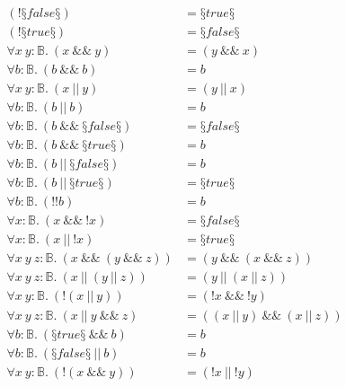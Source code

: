 \begin{conjectureset}[H]
\begin{align}
(!§false§) &= §true§\ \label{overlapenum:not_false2}\\
(!§true§) &= §false§\ \label{overlapenum:not_true2}\\
\forall x\ y : \mathbb{B}.\ (x\ \&\&\ y) &= (y\ \&\&\ x)\ \label{overlapenum:and_comm2}\\
\forall b : \mathbb{B}.\ (b\ \&\&\ b) &= b\ \label{overlapenum:and_self2}\\
\forall x\ y : \mathbb{B}.\ (x\ ||\ y) &= (y\ ||\ x)\ \label{overlapenum:or_comm2}\\
\forall b : \mathbb{B}.\ (b\ ||\ b) &= b\ \label{overlapenum:or_self2}\\
\forall b : \mathbb{B}.\ (b\ \&\&\ §false§) &= §false§\ \label{overlapenum:and_false2}\\
\forall b : \mathbb{B}.\ (b\ \&\&\ §true§) &= b\ \label{overlapenum:and_true2}\\
\forall b : \mathbb{B}.\ (b\ ||\ §false§) &= b\ \label{overlapenum:or_false2}\\
\forall b : \mathbb{B}.\ (b\ ||\ §true§) &= §true§\ \label{overlapenum:or_true2}\\
\forall b : \mathbb{B}.\ (!!b) &= b\ \label{overlapenum:not_not2}\\
\forall x : \mathbb{B}.\ (x\ \&\&\ !x) &= §false§\ \label{overlapenum:and_not_self2}\\
\forall x : \mathbb{B}.\ (x\ ||\ !x) &= §true§\ \label{overlapenum:or_not_self2}\\
\forall x\ y\ z : \mathbb{B}.\ (x\ \&\&\ (y\ \&\&\ z)) &= (y\ \&\&\ (x\ \&\&\ z))\ \label{overlapenum:and_left_comm2}\\
\forall x\ y\ z : \mathbb{B}.\ (x\ ||\ (y\ ||\ z)) &= (y\ ||\ (x\ ||\ z))\ \label{overlapenum:or_left_comm2}\\
\forall x\ y : \mathbb{B}.\ (!(x\ ||\ y)) &= (!x\ \&\&\ !y)\ \label{overlapenum:not_or2}\\
\forall x\ y\ z : \mathbb{B}.\ (x\ ||\ y\ \&\&\ z) &= ((x\ ||\ y)\ \&\&\ (x\ ||\ z))\ \label{overlapenum:or_and_distrib_left2}\\
\forall b : \mathbb{B}.\ (§true§\ \&\&\ b) &= b\ \label{overlapenum:true_and2}\\
\forall b : \mathbb{B}.\ (§false§\ ||\ b) &= b\ \label{overlapenum:false_or2}\\
\forall x\ y : \mathbb{B}.\ (!(x\ \&\&\ y)) &= (!x\ ||\ !y)\ \label{overlapenum:not_and2}\\

\end{align}
\end{conjectureset}
